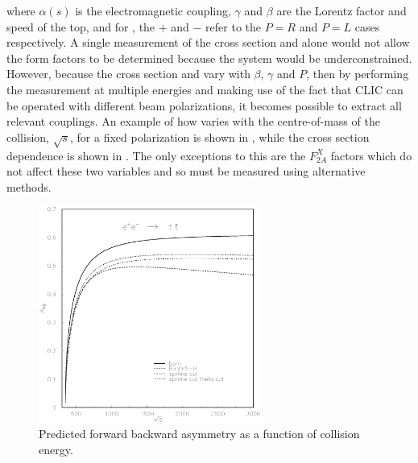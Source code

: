 where $\alpha(s)$  is the electromagnetic coupling, $\gamma$ and $\beta$ are the Lorentz factor and speed of the top, and for , the $+$ and $-$ refer to the $P=R$ and $P=L$ cases respectively. A single measurement of the cross section and \afb alone would not allow the form factors to be determined because the system would be underconstrained. However, because the cross section and \afb vary with $\beta$, $\gamma$ and $P$, then by performing the measurement at multiple energies and making use of the fact that \ac{CLIC} can be operated with different beam polarizations, it becomes possible to extract all relevant couplings. An example of how \afb varies with the centre-of-mass of the collision, $\sqrt{s}$, for a fixed polarization is shown in , while the cross section dependence is shown in . The only exceptions to this are the $F_{2A}^X$ factors which do not affect these two variables and so must be measured using alternative methods. 

\begin{figure}
  \centering
  \includegraphics[width=0.65\textwidth]{TopAnalysis/figures/asym-top.eps}
  \caption[Predicted forward backward asymmetry as a function of collision energy]{Predicted forward backward asymmetry as a function of collision energy\cite{Fleischer:2003kk}.}
  \label{fig:AfbSDependence}
\end{figure}


